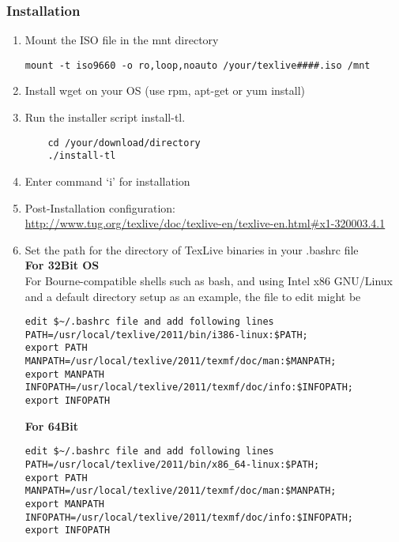 \subsubsection*{Installation}
\begin{enumerate}
\item	Mount the ISO file in the mnt directory
\begin{verbatim}
mount -t iso9660 -o ro,loop,noauto /your/texlive####.iso /mnt
\end{verbatim}

\item	Install wget on your OS (use rpm, apt-get or yum install)
\item	Run the installer script install-tl.
\begin{verbatim}
	cd /your/download/directory
	./install-tl
\end{verbatim}
\item	Enter command `i' for installation

\item	Post-Installation configuration:\\ \href{http://www.tug.org/texlive/doc/texlive-en/texlive-en.html\#x1-320003.4.1}{http://www.tug.org/texlive/doc/texlive-en/texlive-en.html\#x1-320003.4.1} 
\item	Set the path for the directory of TexLive binaries in your .bashrc file\\
\textbf{For 32Bit OS}\\
For Bourne-compatible shells such as bash, and using Intel x86 GNU/Linux and a default directory setup as an example, the file to edit might be \begin{verbatim}
edit $~/.bashrc file and add following lines
PATH=/usr/local/texlive/2011/bin/i386-linux:$PATH; 
export PATH 
MANPATH=/usr/local/texlive/2011/texmf/doc/man:$MANPATH;
export MANPATH 
INFOPATH=/usr/local/texlive/2011/texmf/doc/info:$INFOPATH;
export INFOPATH
\end{verbatim}
\textbf{For 64Bit}
\begin{verbatim}
edit $~/.bashrc file and add following lines
PATH=/usr/local/texlive/2011/bin/x86_64-linux:$PATH;
export PATH 
MANPATH=/usr/local/texlive/2011/texmf/doc/man:$MANPATH;
export MANPATH 
INFOPATH=/usr/local/texlive/2011/texmf/doc/info:$INFOPATH;
export INFOPATH

\end{verbatim}

\end{enumerate}

